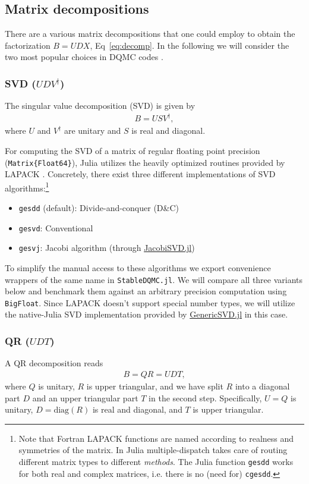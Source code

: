 \documentclass[submission, Phys]{SciPost}
\begin{document}
\subsection{Matrix decompositions}

There are a various matrix decompositions that one could employ to obtain the factorization ${B = UDX}$, Eq~\eqref{eq:decomp}. In the following we will consider the two most popular choices in DQMC codes \cite{Assaad2002a, Loh1989, Santos2003}.

\subsubsection{SVD ($UDV^\dagger$)}
The singular value decomposition (SVD) is given by
\begin{align}
	B = USV^\dagger,
\end{align}
where $U$ and $V^\dagger$ are unitary and $S$ is real and diagonal.

For computing the SVD of a matrix of regular floating point precision (\texttt{Matrix\{Float64\}}), Julia utilizes the heavily optimized routines provided by LAPACK \cite{LAPACK}. Concretely, there exist three different implementations of SVD algorithms:\footnote{Note that Fortran LAPACK functions are named according to realness and symmetries of the matrix. In Julia multiple-dispatch takes care of routing different matrix types to different \textit{methods}. The Julia function \texttt{gesdd} works for both real and complex matrices, i.e. there is no (need for) \texttt{cgesdd}.}
\begin{itemize}
	\item \texttt{gesdd} (default): Divide-and-conquer (D\&C)
	\item \texttt{gesvd}: Conventional
	\item \texttt{gesvj}: Jacobi algorithm (through \href{https://github.com/RalphAS/JacobiSVD.jl}{JacobiSVD.jl})
\end{itemize}
To simplify the manual access to these algorithms we export convenience wrappers of the same name in \texttt{StableDQMC.jl}. We will compare all three variants below and benchmark them against an arbitrary precision computation using \texttt{BigFloat}. Since LAPACK doesn't support special number types, we will utilize the native-Julia SVD implementation provided by \href{https://github.com/JuliaLinearAlgebra/GenericSVD.jl/}{GenericSVD.jl} in this case.

\subsubsection{QR ($UDT$)}
A QR decomposition reads
\begin{align}
	B = QR = UDT,
\end{align}
where $Q$ is unitary, $R$ is upper triangular, and we have split $R$ into a diagonal part $D$ and an upper triangular part $T$ in the second step. Specifically, $U = Q$ is unitary, $D = \textrm{diag}(R)$ is real and diagonal, and $T$ is upper triangular.
\end{document}
